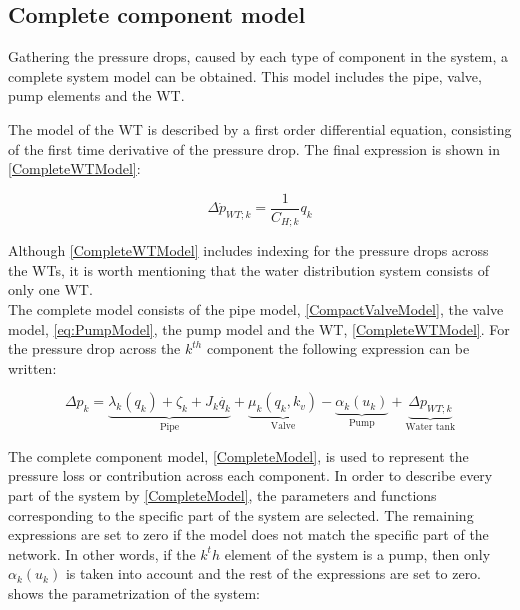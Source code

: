 \subsection{Complete component model}
\label{CompleteSystemModel}
Gathering the pressure drops, caused by each type of component in the system, a complete system model can be obtained. This model includes the pipe, valve, pump elements and the WT. 

The model of the WT is described by a first order differential equation, consisting of the first time derivative of the pressure drop. The final expression is shown in \eqref{CompleteWTModel}:

\begin{equation}
  \label{CompleteWTModel}
  \Delta \dot{p}_{WT;k} = \frac{1}{C_{H;k}} q_k 
\end{equation}

Although \eqref{CompleteWTModel} includes indexing for the pressure drops across the WTs, it is worth mentioning that the water distribution system consists of only one WT.
\\
The complete model consists of the pipe model, \eqref{CompactValveModel}, the valve model, \eqref{eq:PumpModel}, the pump model and the WT, \eqref{CompleteWTModel}. For the pressure drop across the $k^{th}$ component the following expression can be written: 

%

\begin{equation}
\label{CompleteModel}
\Delta p_k = \underbrace{\lambda_k (q_k) + \zeta_k + J_k \dot{q_k}}_\text{Pipe} + \underbrace{\mu_k (q_k, k_v)}_\text{Valve} - \underbrace{\alpha_k(u_k)}_\text{Pump} + \underbrace{\Delta p_{WT;k}}_\text{Water tank}
\end{equation}

The complete component model, \eqref{CompleteModel}, is used to represent the pressure loss or contribution across each component. In order to describe every part of the system by \eqref{CompleteModel}, the parameters and functions corresponding to the specific part of the system are selected. The remaining expressions are set to zero if the model does not match the specific part of the network. In other words, if the $k^th$ element of the system is a pump, then only $\alpha_k(u_k)$ is taken into account and the rest of the expressions are set to zero. 
 shows the parametrization of the system: 

